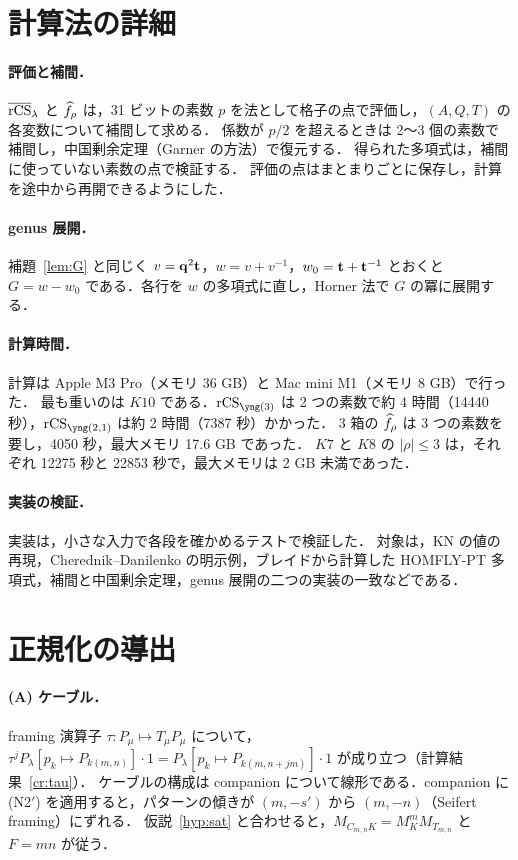 \section{計算法の詳細}\label{app:computation}
\paragraph{評価と補間．}
$\overline{\textrm{rCS}}_\lambda$ と $\widehat{f}_\rho$ は，31 ビットの素数 $p$ を法として格子の点で評価し，$(A,Q,T)$ の各変数について補間して求める．
係数が $p/2$ を超えるときは 2〜3 個の素数で補間し，中国剰余定理（Garner の方法）で復元する．
得られた多項式は，補間に使っていない素数の点で検証する．
評価の点はまとまりごとに保存し，計算を途中から再開できるようにした．
\paragraph{genus 展開．}
補題~\ref{lem:G} と同じく $v=\mathbf{q}^2\mathbf{t}$，$w=v+v^{-1}$，$w_0=\mathbf{t}+\mathbf{t}^{-1}$ とおくと $G=w-w_0$ である．各行を $w$ の多項式に直し，Horner 法で $G$ の冪に展開する．
\paragraph{計算時間．}
計算は Apple M3 Pro（メモリ 36 GB）と Mac mini M1（メモリ 8 GB）で行った．
最も重いのは $K10$ である．$\rCS_{\yng(3)}$ は 2 つの素数で約 4 時間（14440 秒），$\rCS_{\yng(2,1)}$ は約 2 時間（7387 秒）かかった．
3 箱の $\widehat f_\rho$ は 3 つの素数を要し，4050 秒，最大メモリ 17.6 GB であった．
$K7$ と $K8$ の $|\rho|\le3$ は，それぞれ 12275 秒と 22853 秒で，最大メモリは 2 GB 未満であった．
\paragraph{実装の検証．}
実装は，小さな入力で各段を確かめるテストで検証した．
対象は，KN の値の再現，Cherednik--Danilenko の明示例，ブレイドから計算した HOMFLY-PT 多項式，補間と中国剰余定理，genus 展開の二つの実装の一致などである．

\section{正規化の導出}\label{app:normalization}
\paragraph{(A) ケーブル．}
framing 演算子 $\tau:P_\mu\mapsto T_\mu P_\mu$ について，$\tau^jP_\lambda[p_k\mapsto P_{k(m,n)}]\cdot1=P_\lambda[p_k\mapsto P_{k(m,n+jm)}]\cdot1$ が成り立つ（計算結果~\ref{cr:tau}）．
ケーブルの構成は companion について線形である．companion に (N2$'$) を適用すると，パターンの傾きが $(m,-s')$ から $(m,-n)$（Seifert framing）にずれる．
仮説~\ref{hyp:sat} と合わせると，$M_{C_{m,n}K}=M_K^mM_{T_{m,n}}$ と $F=mn$ が従う．
